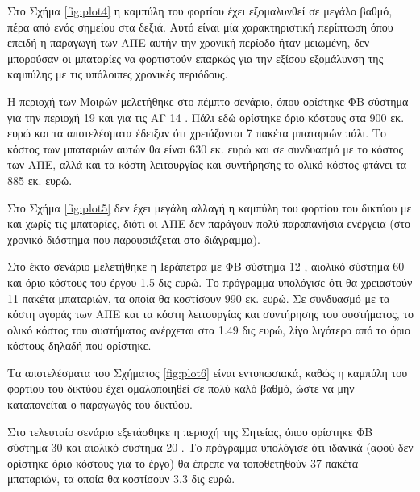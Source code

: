 \documentclass[12pt]{report}
\begin{document}
Στο Σχήμα \ref{fig:plot4} η καμπύλη του φορτίου έχει εξομαλυνθεί σε μεγάλο βαθμό, πέρα από ενός σημείου στα δεξιά. Αυτό είναι μία χαρακτηριστική περίπτωση όπου επειδή η παραγωγή των ΑΠΕ αυτήν την χρονική περίοδο ήταν μειωμένη,
δεν μπορούσαν οι μπαταρίες να φορτιστούν επαρκώς για την εξίσου εξομάλυνση της καμπύλης με τις υπόλοιπες χρονικές περιόδους.

\begin{center}
\end{center}

Η περιοχή των Μοιρών μελετήθηκε στο πέμπτο σενάριο, όπου ορίστηκε ΦΒ σύστημα για την περιοχή 19 {} και για τις ΑΓ 14 {}. Πάλι εδώ ορίστηκε όριο κόστους στα 900 εκ. ευρώ και τα αποτελέσματα έδειξαν ότι
χρειάζονται 7 πακέτα μπαταριών πάλι. Το κόστος των μπαταριών αυτών θα είναι 630 εκ. ευρώ και σε συνδυασμό με το κόστος των ΑΠΕ, αλλά και τα κόστη λειτουργίας και συντήρησης το ολικό κόστος φτάνει τα 885 εκ. ευρώ.

Στο Σχήμα \ref{fig:plot5} δεν έχει μεγάλη αλλαγή η καμπύλη του φορτίου του δικτύου με και χωρίς τις μπαταρίες, διότι οι ΑΠΕ δεν παράγουν πολύ παραπανήσια ενέργεια (στο χρονικό διάστημα που παρουσιάζεται στο διάγραμμα).

Στο έκτο σενάριο μελετήθηκε η Ιεράπετρα με ΦΒ σύστημα 12 {}, αιολικό σύστημα 60 {} και όριο κόστους του έργου 1.5 δις ευρώ. Το πρόγραμμα υπολόγισε ότι θα χρειαστούν 11 πακέτα μπαταριών, τα οποία θα
κοστίσουν 990 εκ. ευρώ. Σε συνδυασμό με τα κόστη αγοράς των ΑΠΕ και τα κόστη λειτουργίας και συντήρησης του συστήματος, το ολικό κόστος του συστήματος ανέρχεται στα 1.49 δις ευρώ, λίγο λιγότερο από το όριο κόστους δηλαδή που
ορίστηκε.

Τα αποτελέσματα του Σχήματος \ref{fig:plot6} είναι εντυπωσιακά, καθώς η καμπύλη του φορτίου του δικτύου έχει ομαλοποιηθεί σε πολύ καλό βαθμό, ώστε να μην καταπονείται ο παραγωγός του δικτύου.

\begin{center}
\end{center}

Στο τελευταίο σενάριο εξετάσθηκε η περιοχή της Σητείας, όπου ορίστηκε ΦΒ σύστημα 30 {} και αιολικό σύστημα 20 {}. Το πρόγραμμα υπολόγισε ότι ιδανικά (αφού δεν ορίστηκε όριο κόστους για το έργο) θα 
έπρεπε να τοποθετηθούν 37 πακέτα μπαταριών, τα οποία θα κοστίσουν 3.3 δις ευρώ.
\end{document}

